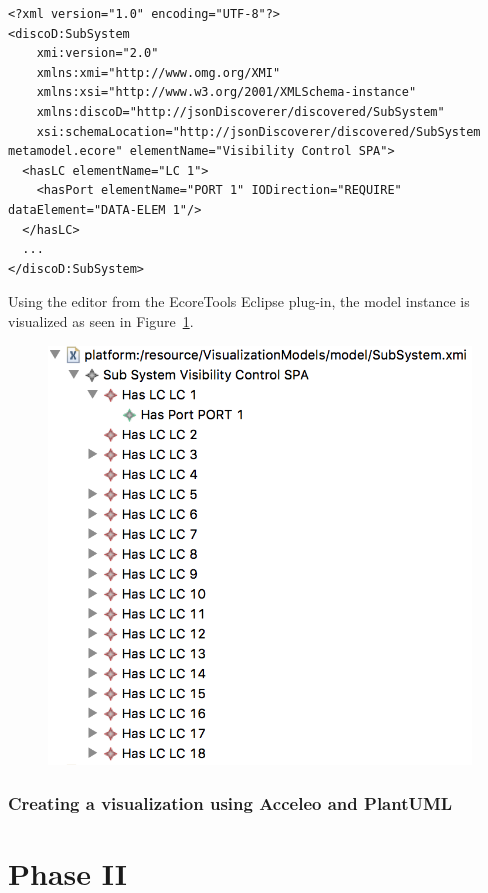 \begin{lstlisting}[caption=Data model or model instance discovered by JSON discoverer,label=code:model_instance_xmi]
<?xml version="1.0" encoding="UTF-8"?>
<discoD:SubSystem
    xmi:version="2.0"
    xmlns:xmi="http://www.omg.org/XMI"
    xmlns:xsi="http://www.w3.org/2001/XMLSchema-instance"
    xmlns:discoD="http://jsonDiscoverer/discovered/SubSystem"
    xsi:schemaLocation="http://jsonDiscoverer/discovered/SubSystem metamodel.ecore" elementName="Visibility Control SPA">
  <hasLC elementName="LC 1">
    <hasPort elementName="PORT 1" IODirection="REQUIRE" dataElement="DATA-ELEM 1"/>
  </hasLC>
  ...
</discoD:SubSystem>
\end{lstlisting}

Using the editor from the EcoreTools Eclipse plug-in, the model instance is visualized as seen in Figure~\ref{fig:new_model_instance}.

\begin{figure}[H]
\centering
\captionsetup{justification=centering}
\vspace{0cm}%
\includegraphics[width=0.6\linewidth]{figure/new_model/new_model_instance.png}
\caption{}
\label{fig:new_model_instance}
\end{figure}

\subsubsection{Creating a visualization using Acceleo and PlantUML}
\todo{[to be filled in]}


\section{Phase II}

